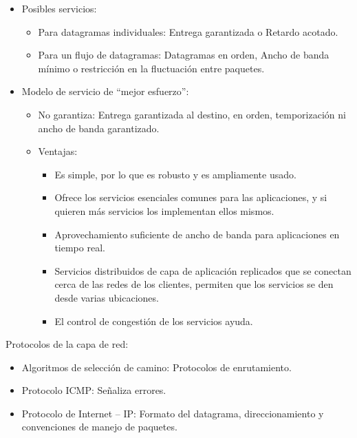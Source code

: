 \documentclass[12pt, twoside, openright]{report} %
\begin{document}
\begin{itemize}
	\item Posibles servicios:

	      \begin{itemize}
		      \item Para datagramas individuales: Entrega garantizada o Retardo
		            acotado.
		      \item Para un flujo de datagramas: Datagramas en orden, Ancho de banda
		            mínimo o restricción en la fluctuación entre paquetes.
	      \end{itemize}
	\item Modelo de servicio de ``mejor esfuerzo'':

	      \begin{itemize}
		      \item No garantiza: Entrega garantizada al destino, en orden,
		            temporización ni ancho de banda garantizado.
		      \item Ventajas:

		            \begin{itemize}
			            \item Es simple, por lo que es robusto y es ampliamente usado.
			            \item Ofrece los servicios esenciales comunes para las aplicaciones,
			                  y si quieren más servicios los implementan ellos mismos.
			            \item Aprovechamiento suficiente de ancho de banda para aplicaciones
			                  en tiempo real.
			            \item Servicios distribuidos de capa de aplicación replicados que se
			                  conectan cerca de las redes de los clientes, permiten que los
			                  servicios se den desde varias ubicaciones.
			            \item El control de congestión de los servicios ayuda.
		            \end{itemize}
	      \end{itemize}
\end{itemize}

Protocolos de la capa de red:

\begin{itemize}
	\item Algoritmos de selección de camino: Protocolos de enrutamiento.
	\item Protocolo ICMP: Señaliza errores.
	\item Protocolo de Internet -- IP: Formato del datagrama,
	      direccionamiento y convenciones de manejo de paquetes.
\end{itemize}
\end{document}
